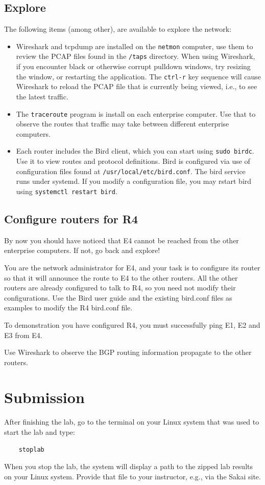 \subsection{Explore}
The following items (among other), are available to explore the network:
\begin{itemize}
\item Wireshark and tcpdump are installed on the {\tt netmon} computer, use them to review the PCAP files found in
the {\tt /taps} directory.  When using Wireshark, if you encounter black or otherwise corrupt pulldown windows, try resizing the window,
or restarting the application.  The {\tt ctrl-r} key sequence will cause Wireshark to reload the PCAP file that is
currently being viewed, i.e., to see the latest traffic.
\item The {\tt traceroute} program is install on each enterprise computer.  Use that to observe the routes that
traffic may take between different enterprise computers.
\item Each router includes the Bird client, which you can start using {\tt sudo birdc}.  Use it to view routes and
protocol definitions.  Bird is configured via use of configuration files found at {\tt /usr/local/etc/bird.conf}. 
The bird service runs under systemd.  If you modify a configuration file, you may rstart bird using {\tt systemctl restart
bird}.
\end{itemize}

\subsection{Configure routers for R4}
By now you should have noticed that E4 cannot be reached from the other enterprise computers.  If not, go back and 
explore!

You are the network administrator for E4, and your task is to configure its router so that it will announce
the route to E4 to the other routers.  All the other routers are already configured to talk to R4, so you need
not modify their configurations.    Use the Bird user guide and the existing bird.conf files as examples 
to modify the R4 bird.conf file.  

To demonstration you have configured R4, you must successfully ping E1, E2 and E3 from E4.

Use Wireshark to observe the BGP routing information propagate to the other routers.

\section{Submission}
After finishing the lab, go to the terminal on your Linux system that was used to start the lab and type:
\begin{verbatim}
    stoplab 
\end{verbatim}
When you stop the lab, the system will display a path to the zipped lab results on your Linux system.  Provide that file to 
your instructor, e.g., via the Sakai site.

\copyrightnotice


